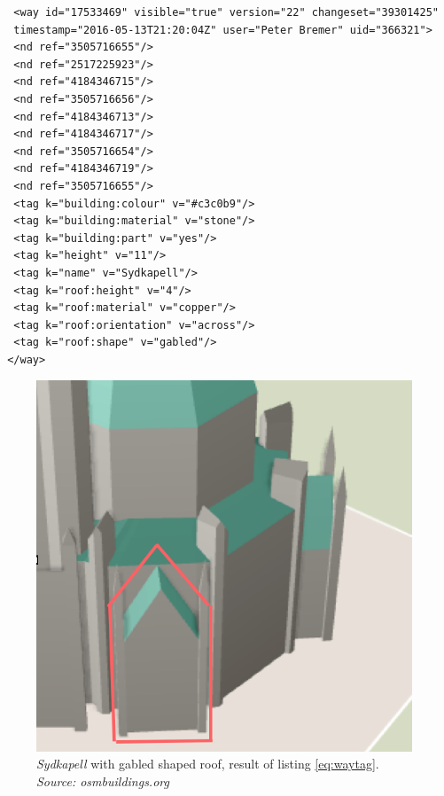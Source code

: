 \begin{lstlisting}
  <way id="17533469" visible="true" version="22" changeset="39301425" 
  timestamp="2016-05-13T21:20:04Z" user="Peter Bremer" uid="366321">
  <nd ref="3505716655"/>
  <nd ref="2517225923"/>
  <nd ref="4184346715"/>
  <nd ref="3505716656"/>
  <nd ref="4184346713"/>
  <nd ref="4184346717"/>
  <nd ref="3505716654"/>
  <nd ref="4184346719"/>
  <nd ref="3505716655"/>
  <tag k="building:colour" v="#c3c0b9"/>
  <tag k="building:material" v="stone"/>
  <tag k="building:part" v="yes"/>
  <tag k="height" v="11"/>
  <tag k="name" v="Sydkapell"/>
  <tag k="roof:height" v="4"/>
  <tag k="roof:material" v="copper"/>
  <tag k="roof:orientation" v="across"/>
  <tag k="roof:shape" v="gabled"/>
 </way>
\end{lstlisting}

\begin{figure}[H]
    \centering
    \includegraphics[scale=0.5]{figures/FixedByMe/nidaros3D.png}
    \caption{\textit{Sydkapell} with gabled shaped roof, result of listing \ref{eq:waytag}. \textit{Source: osmbuildings.org}}
    \label{fig:erkeinng}
\end{figure} 